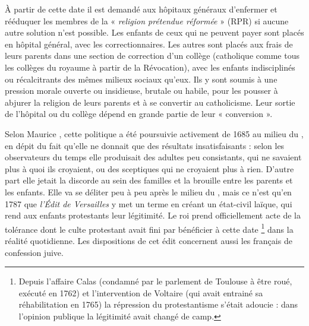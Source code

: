  À partir de cette date il est demandé aux hôpitaux généraux d'enfermer et rééduquer les membres de la « \emph{religion prétendue réformée} » (RPR) si aucune autre solution n'est possible. Les enfants de ceux qui ne peuvent payer sont placés en hôpital général, avec les correctionnaires. Les autres sont placés aux frais de leurs parents dans une section de correction d'un collège (catholique comme tous les collèges du royaume à partir de la Révocation), avec les enfants indisciplinés ou récalcitrants des mêmes milieux sociaux qu'eux. Ils y sont soumis à une pression morale ouverte ou insidieuse, brutale ou habile, pour les pousser à abjurer la religion de leurs parents et à se convertir au catholicisme. Leur sortie de l'hôpital ou du collège dépend en grande partie de leur « conversion ». 

 Selon Maurice , cette politique a été poursuivie activement de 1685 au milieu du , en dépit du fait qu'elle ne donnait que des résultats insatisfaisants : selon les observateurs du temps elle produisait des adultes peu consistants, qui ne savaient plus à quoi ils croyaient, ou des sceptiques qui ne croyaient plus à rien. D'autre part elle jetait la discorde au sein des familles et la brouille entre les parents et les enfants. Elle va se déliter peu à peu après le milieu du , mais ce n'est qu'en 1787 que \emph{l'Édit de Versailles} y met un terme en créant un état-civil laïque, qui rend aux enfants protestants leur légitimité. Le roi prend officiellement acte de la tolérance dont le culte protestant avait fini par bénéficier à cette date%
\footnote{Depuis l'affaire Calas (condamné par le parlement de Toulouse à être roué, exécuté en 1762) et l'intervention de Voltaire (qui avait entrainé sa réhabilitation en 1765) la répression du protestantisme s'était adoucie : dans l'opinion publique la légitimité avait changé de camp.} 
dans la réalité quotidienne. Les dispositions de cet édit concernent aussi les français de confession juive.


